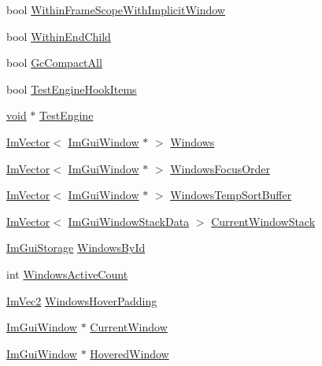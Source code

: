 \begin{DoxyCompactItemize}
\item 
bool \hyperlink{structImGuiContext_aad225e155364262380ea2e6ea306381a}{Within\+Frame\+Scope\+With\+Implicit\+Window}
\item 
bool \hyperlink{structImGuiContext_a87f71757a5e647648ad9417cb21091d6}{Within\+End\+Child}
\item 
bool \hyperlink{structImGuiContext_a76187b6c38ef1c4024852baae5bb26d9}{Gc\+Compact\+All}
\item 
bool \hyperlink{structImGuiContext_ae2909a189f72609068a9f1ef429f9540}{Test\+Engine\+Hook\+Items}
\item 
\hyperlink{imgui__impl__opengl3__loader_8h_ac668e7cffd9e2e9cfee428b9b2f34fa7}{void} $\ast$ \hyperlink{structImGuiContext_a41245f5433674e8e818058692e68c27f}{Test\+Engine}
\item 
\hyperlink{structImVector}{Im\+Vector}$<$ \hyperlink{structImGuiWindow}{Im\+Gui\+Window} $\ast$ $>$ \hyperlink{structImGuiContext_a0f59a9a861d097be066c6cc106e40f3e}{Windows}
\item 
\hyperlink{structImVector}{Im\+Vector}$<$ \hyperlink{structImGuiWindow}{Im\+Gui\+Window} $\ast$ $>$ \hyperlink{structImGuiContext_a1fd9e62737932c069dce5f137a4a4fab}{Windows\+Focus\+Order}
\item 
\hyperlink{structImVector}{Im\+Vector}$<$ \hyperlink{structImGuiWindow}{Im\+Gui\+Window} $\ast$ $>$ \hyperlink{structImGuiContext_a21665657dd462ee265755c99fe7b94e2}{Windows\+Temp\+Sort\+Buffer}
\item 
\hyperlink{structImVector}{Im\+Vector}$<$ \hyperlink{structImGuiWindowStackData}{Im\+Gui\+Window\+Stack\+Data} $>$ \hyperlink{structImGuiContext_a9ab54092f94cbf9b8e8b9bc3bdbc0759}{Current\+Window\+Stack}
\item 
\hyperlink{structImGuiStorage}{Im\+Gui\+Storage} \hyperlink{structImGuiContext_adc1e46e1c1582a0f0eb74d957efedf98}{Windows\+By\+Id}
\item 
int \hyperlink{structImGuiContext_a95237c5f9eb869da0f1947c54a521489}{Windows\+Active\+Count}
\item 
\hyperlink{structImVec2}{Im\+Vec2} \hyperlink{structImGuiContext_a21d3704971b7f7fc8454828bf8747c2b}{Windows\+Hover\+Padding}
\item 
\hyperlink{structImGuiWindow}{Im\+Gui\+Window} $\ast$ \hyperlink{structImGuiContext_aa923044f396241668aef5ed2f4c4d847}{Current\+Window}
\item 
\hyperlink{structImGuiWindow}{Im\+Gui\+Window} $\ast$ \hyperlink{structImGuiContext_a6dd89693704216a036d2676b8c6610f8}{Hovered\+Window}

\end{DoxyCompactItemize}
